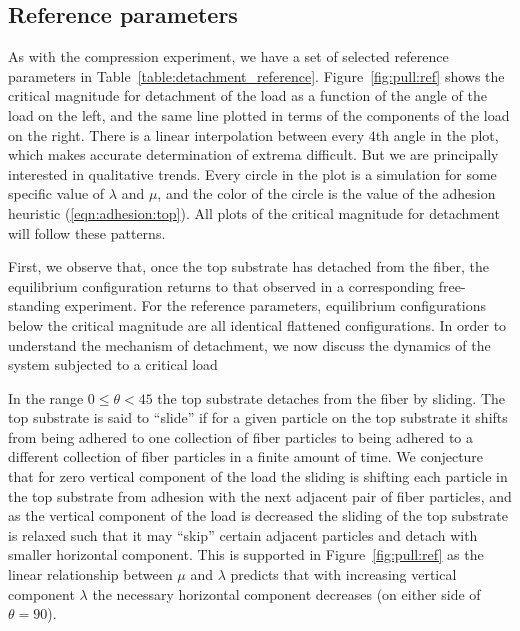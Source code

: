 \subsection{Reference parameters}

As with the compression experiment, we have a set of selected reference parameters in Table~\ref{table:detachment_reference}. Figure~\ref{fig:pull:ref} shows the critical magnitude for detachment of the load as a function of the angle of the load on the left, and the same line plotted in terms of the components of the load on the right. There is a linear interpolation between every $4$th angle in the plot, which makes accurate determination of extrema difficult. But we are principally interested in qualitative trends. Every circle in the plot is a simulation for some specific value of $\lambda$ and $\mu$, and the color of the circle is the value of the adhesion heuristic (\ref{eqn:adhesion:top}). All plots of the critical magnitude for detachment will follow these patterns.

First, we observe that, once the top substrate has detached from the fiber, the equilibrium configuration returns to that observed in a corresponding free-standing experiment.
For the reference parameters, equilibrium configurations below the critical magnitude are all identical flattened configurations. In order to understand the mechanism of detachment, we now discuss the dynamics of the system subjected to a critical load

In the range $0 \leq \theta < 45$ the top substrate detaches from the fiber by sliding. The top substrate is said to ``slide'' if for a given particle on the top substrate it shifts from being adhered to one collection of fiber particles to being adhered to a different collection of fiber particles in a finite amount of time. We conjecture that for zero vertical component of the load the sliding is shifting each particle in the top substrate from adhesion with the next adjacent pair of fiber particles, and as the vertical component of the load is decreased the sliding of the top substrate is relaxed such that it may ``skip'' certain adjacent particles and detach with smaller horizontal component. This is supported in Figure~\ref{fig:pull:ref} as the linear relationship between $\mu$ and $\lambda$ predicts that with increasing vertical component $\lambda$ the necessary horizontal component decreases (on either side of $\theta = 90$\textdegree).

